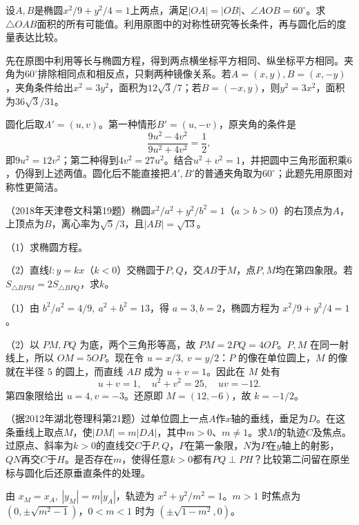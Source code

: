 设\(A,B\)是椭圆\(x^2/9+y^2/4=1\)上两点，满足\(|OA|=|OB|\)、\(\angle AOB=60^\circ\)。求\(\triangle OAB\)面积的所有可能值。利用原图中的对称性研究等长条件，再与圆化后的度量表达比较。
\par
\solutionanswer
先在原图中利用等长与椭圆方程，得到两点横坐标平方相同、纵坐标平方相同。夹角为\(60^\circ\)排除相同点和相反点，只剩两种镜像关系。若\(A=(x,y),B=(x,-y)\)，夹角条件给出\(x^2=3y^2\)，面积为\(12\sqrt3/7\)；若\(B=(-x,y)\)，则\(y^2=3x^2\)，面积为\(36\sqrt3/31\)。

圆化后取\(A'=(u,v)\)。第一种情形\(B'=(u,-v)\)，原夹角的条件是
\[
 \frac{9u^2-4v^2}{9u^2+4v^2}=\frac12,
\]
即\(9u^2=12v^2\)；第二种得到\(4v^2=27u^2\)。结合\(u^2+v^2=1\)，并把圆中三角形面积乘\(6\)，仍得到上述两值。圆化后不能直接把\(A',B'\)的普通夹角取为\(60^\circ\)；此题先用原图对称性更简洁。


（2018年天津卷文科第19题）椭圆\(x^2/a^2+y^2/b^2=1\)（\(a>b>0\)）的右顶点为\(A\)，上顶点为\(B\)，离心率为\(\sqrt5/3\)，且\(|AB|=\sqrt{13}\)。


（1）求椭圆方程。
\par



（2）直线\(l:y=kx\)（\(k<0\)）交椭圆于\(P,Q\)，交\(AB\)于\(M\)，点\(P,M\)均在第四象限。若\(S_{\triangle BPM}=2S_{\triangle BPQ}\)，求\(k\)。
\par
\solutionanswer
（1）由 \(b^2/a^2=4/9,\ a^2+b^2=13\)，得 \(a=3,b=2\)，椭圆方程为 \(x^2/9+y^2/4=1\)。

（2）以 \(PM,PQ\) 为底，两个三角形等高，故 \(PM=2PQ=4OP\)。\(P,M\) 在同一射线上，所以 \(OM=5OP\)。现在令 \(u=x/3,\ v=y/2\)：\(P\) 的像在单位圆上，\(M\) 的像就在半径 \(5\) 的圆上，而直线 \(AB\) 成为 \(u+v=1\)。因此在 \(M\) 处有
\[
  u+v=1,\quad u^2+v^2=25,\quad uv=-12 .
\]
第四象限给出 \(u=4,v=-3\)。还原即 \(M=(12,-6)\)，故 \(k=-1/2\)。


（据2012年湖北卷理科第21题）过单位圆上一点\(A\)作\(x\)轴的垂线，垂足为\(D\)。在这条垂线上取点\(M\)，使\(|DM|=m|DA|\)，其中\(m>0\)、\(m\ne1\)。求\(M\)的轨迹\(C\)及焦点。过原点、斜率为\(k>0\)的直线交\(C\)于\(P,Q\)，\(P\)在第一象限，\(N\)为\(P\)在\(y\)轴上的射影，\(QN\)再交\(C\)于\(H\)。是否存在\(m\)，使得任意\(k>0\)都有\(PQ\perp PH\)？比较第二问留在原坐标与圆化后还原垂直条件的处理。
\par
\solutionanswer
由 \(x_M=x_A,\ |y_M|=m|y_A|\)，轨迹为 \(x^2+y^2/m^2=1\)。\(m>1\) 时焦点为 \((0,\pm\sqrt{m^2-1})\)，\(0<m<1\) 时为 \((\pm\sqrt{1-m^2},0)\)。

